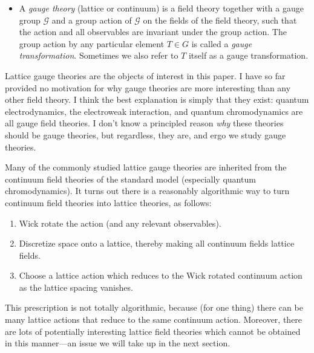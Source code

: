 \documentclass[9pt,twocolumn,twoside]{article}
\begin{document}
\begin{itemize}
\item A \textit{gauge theory} (lattice or continuum) is a field theory together with a gauge group $\mathcal{G}$ and a group action of $\mathcal{G}$ on the fields of the field theory, such that the action and all observables are invariant under the group action.  The group action by any particular element $T \in G$ is called a \textit{gauge transformation}.  Sometimes we also refer to $T$ itself as a gauge transformation.
\end{itemize}

Lattice gauge theories are the objects of interest in this paper.  I have so far provided no motivation for why gauge theories are more interesting than any other field theory.  I think the best explanation is simply that they exist: quantum electrodynamics, the electroweak interaction, and quantum chromodynamics are all gauge field theories.  I don't know a principled reason \textit{why} these theories should be gauge theories, but regardless, they are, and ergo we study gauge theories.

Many of the commonly studied lattice gauge theories are inherited from the continuum field theories of the standard model (especially quantum chromodynamics).  It turns out there is a reasonably algorithmic way to turn continuum field theories into lattice theories, as follows:
\begin{enumerate}
\item Wick rotate the action (and any relevant observables). 
\item Discretize space onto a lattice, thereby making all continuum fields lattice fields.
\item Choose a lattice action which reduces to the Wick rotated continuum action as the lattice spacing vanishes.
\end{enumerate}

This prescription is not totally algorithmic, because (for one thing) there can be many lattice actions that reduce to the same continuum action.  Moreover, there are lots of potentially interesting lattice field theories which cannot be obtained in this manner---an issue we will take up in the next section.
\end{document}
